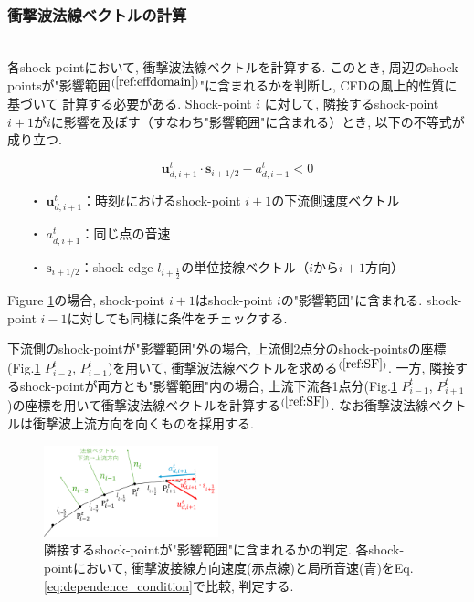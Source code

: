 \documentclass[a4j]{jarticle}
\begin{document}
\subsubsection{衝撃波法線ベクトルの計算} \label{subsubsec:normal}
\mbox{}\\[-1.0ex]

各shock-pointにおいて, 衝撃波法線ベクトルを計算する. このとき, 周辺のshock-pointsが"影響範囲$^{(\ref{ref:effdomain})}$"に含まれるかを判断し, CFDの風上的性質に基づいて
計算する必要がある.
Shock-point $i$ に対して, 隣接するshock-point $i+1$が$i$に影響を及ぼす（すなわち"影響範囲"に含まれる）とき,
以下の不等式が成り立つ.

\begin{equation}
\bm{u}_{d,i+1}^t \cdot \bm{s}_{i+1/2} - a_{d,i+1}^t < 0 \label{eq:dependence_condition}
\end{equation}
\begin{itemize}
\item[・] $\bm{u}_{d,i+1}^t$：時刻$t$におけるshock-point $i+1$の下流側速度ベクトル
\item[・] $a_{d,i+1}^t$：同じ点の音速
\item[・] $\bm{s}_{i+1/2}$：shock-edge $l_{i+\frac{1}{2}}$の単位接線ベクトル（$i$から$i+1$方向）
\end{itemize}
Figure \ref{fig:shocknormal}の場合, shock-point $i+1$はshock-point $i$の"影響範囲"に含まれる.
shock-point $i-1$に対しても同様に条件をチェックする.

下流側のshock-pointが"影響範囲"外の場合, 上流側2点分のshock-pointsの座標(Fig.\ref{fig:shocknormal} $P_{i-2}^t$, $P_{i-1}^t$)を用いて, 衝撃波法線ベクトルを求める$^{(\ref{ref:SF})}$.
一方, 隣接するshock-pointが両方とも"影響範囲"内の場合, 上流下流各1点分(Fig.\ref{fig:shocknormal} $P_{i-1}^t$, $P_{i+1}^t$)の座標を用いて衝撃波法線ベクトルを計算する$^{(\ref{ref:SF})}$.
なお衝撃波法線ベクトルは衝撃波上流方向を向くものを採用する.
\begin{figure}[h]
    \begin{center}
        \includegraphics[width=0.45\textwidth]{shocknormal.pdf}
    \end{center}
    \caption{隣接するshock-pointが"影響範囲"に含まれるかの判定. 各shock-pointにおいて, 
    衝撃波接線方向速度(赤点線)と局所音速(青)をEq.\ref{eq:dependence_condition}で比較, 判定する.}
    \label{fig:shocknormal}
\end{figure}
\end{document}
